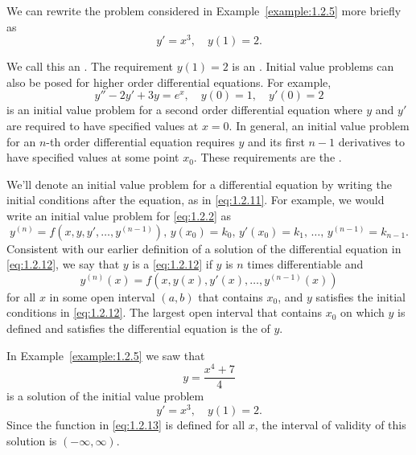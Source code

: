 \documentclass{ximera}
\begin{document}
 We can rewrite the problem considered in Example~\ref{example:1.2.5}
more briefly as
$$
y'=x^3,\quad y(1)=2.
$$

 We call this an .
The requirement $y(1)=2$ is an .
 Initial value problems can also be
posed for higher order differential equations.  For example,
\begin{equation} \label{eq:1.2.11}
y'' - 2y'+3y=e^x, \quad y(0)=1, \quad y'(0)=2
\end{equation}
is  an initial value problem for a second order differential
equation where $y$ and $y'$ are required to have specified values at
 $x=0$. In general, an initial value
problem for an $n$-th order differential equation requires $y$ and its
first $n-1$ derivatives to have specified values at some point $x_0$.
These requirements are the .

We'll denote an initial value problem for a differential equation by
writing the initial conditions after the equation, as in
\eqref{eq:1.2.11}. For example, we would write an initial value problem
for \eqref{eq:1.2.2} as
\begin{equation} \label{eq:1.2.12}
y^{(n)}=f(x,y,y', \dots,y^{(n-1)}),\, y(x_0)=k_0,\,
y'(x_0)=k_1,\, \dots,\, y^{(n-1)}=k_{n-1}.
\end{equation}
Consistent with our earlier definition of a solution of the
differential equation in \eqref{eq:1.2.12}, we say that $y$ is a  \eqref{eq:1.2.12}  if $y$ is $n$ times
differentiable and
$$
y^{(n)}(x)=f(x,y(x),y'(x), \dots,y^{(n-1)}(x))
$$
for all $x$ in some open interval $(a,b)$  that contains $x_0$,
and  $y$ satisfies the initial conditions in \eqref{eq:1.2.12}. The
largest open interval that contains $x_0$ on which $y$ is defined and
satisfies the differential equation is  the  of $y$.

\begin{example}\label{example:1.2.6}
In Example~\ref{example:1.2.5} we saw that
\begin{equation} \label{eq:1.2.13}
y=\frac{x^4+7}{4}
\end{equation}
is a solution of the initial value problem
$$
y'=x^3,\quad y(1)=2.
$$
Since the function in \eqref{eq:1.2.13} is defined for all $x$, the
interval of validity of this solution is $(-\infty,\infty)$.
\end{example}
\end{document}
